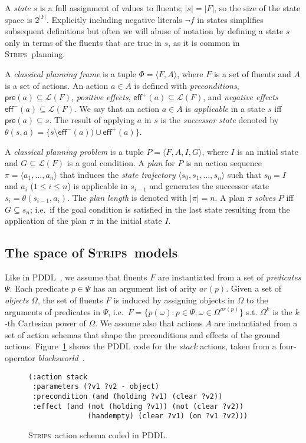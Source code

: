 \documentclass[letterpaper]{article} %
\newcommand{\tup}[1]{{\langle #1 \rangle}}
\newcommand{\pre}{\mathsf{pre}}     %
\newcommand{\eff}{\mathsf{eff}}     %
\newcommand{\strips}{\textsc{Strips}}     %
\begin{document}
A {\em state} $s$ is a full assignment of values to fluents; $|s|=|F|$, so the size of the state space is $2^{|F|}$. Explicitly including negative literals $\neg f$ in states simplifies subsequent definitions but often we will abuse of notation by defining a state $s$ only in terms of the fluents that are true in $s$, as it is common in \strips\ planning.

A {\em classical planning frame} is a tuple $\Phi=\tup{F,A}$, where $F$ is a set of fluents and $A$ is a set of actions. An action $a\in A$ is defined with {\em preconditions}, $\pre(a)\subseteq\mathcal{L}(F)$, {\em positive effects}, $\eff^+(a)\subseteq\mathcal{L}(F)$, and {\em negative effects} $\eff^-(a)\subseteq\mathcal{L}(F)$. We say that an action $a\in A$ is {\em applicable} in a state $s$ iff $\pre(a)\subseteq s$. The result of applying $a$ in $s$ is the {\em successor state} denoted by $\theta(s,a)=\{s\setminus\eff^-(a))\cup\eff^+(a)\}$.

A {\em classical planning problem} is a tuple $P=\tup{F,A,I,G}$, where $I$ is an initial state and $G\subseteq\mathcal{L}(F)$ is a goal condition. A {\em plan} for $P$ is an action sequence $\pi=\tup{a_1, \ldots, a_n}$ that induces the {\em state trajectory} $\tup{s_0, s_1, \ldots, s_n}$ such that $s_0=I$ and $a_i$ ({\small $1\leq i\leq n$}) is applicable in $s_{i-1}$ and generates the successor state $s_i=\theta(s_{i-1},a_i)$. The {\em plan length} is denoted with $|\pi|=n$. A plan $\pi$ {\em solves} $P$ iff $G\subseteq s_n$; i.e.~if the goal condition is satisfied in the last state resulting from the application of the plan $\pi$ in the initial state $I$.

\subsection{The space of \strips\ models}
Like in PDDL~\cite{mcdermott1998pddl,fox2003pddl2}, we assume that fluents $F$ are instantiated from a set of {\em predicates} $\Psi$. Each predicate $p\in\Psi$ has an argument list of arity $ar(p)$. Given a set of {\em objects} $\Omega$, the set of fluents $F$ is induced by assigning objects in $\Omega$ to the arguments of predicates in $\Psi$, i.e.~$F=\{p(\omega):p\in\Psi,\omega\in\Omega^{ar(p)}\}$ s.t. $\Omega^k$ is the $k$-th Cartesian power of $\Omega$. We assume also that actions $A$ are instantiated from a set of action schemas that shape the preconditions and effects of the ground actions. Figure~\ref{fig:stack} shows the PDDL code for the {\em stack} actions, taken from a four-operator {\em blocksworld}~\cite{slaney2001blocks}.
\begin{figure}
\begin{scriptsize}
\begin{verbatim}
(:action stack
 :parameters (?v1 ?v2 - object)
 :precondition (and (holding ?v1) (clear ?v2))
 :effect (and (not (holding ?v1)) (not (clear ?v2))
              (handempty) (clear ?v1) (on ?v1 ?v2)))
\end{verbatim}
\end{scriptsize}
 \caption{\small \strips\ action schema coded in PDDL.}
\label{fig:stack}
\end{figure}
\end{document}
